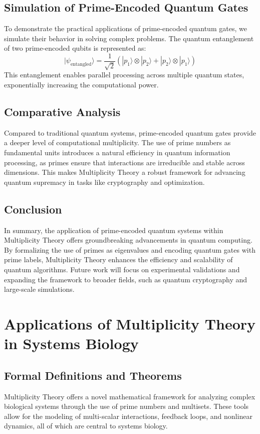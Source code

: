 \documentclass[%
 preprint, linenumbers,
 amsmath,amssymb,
 aps, physrev,
]{revtex4-2}
\begin{document}
\subsection{Simulation of Prime-Encoded Quantum Gates}
To demonstrate the practical applications of prime-encoded quantum gates, we simulate their behavior in solving complex problems. The quantum entanglement of two prime-encoded qubits is represented as:
\[
| \psi_{\text{entangled}} \rangle = \frac{1}{\sqrt{2}} \left( | p_1 \rangle \otimes | p_2 \rangle + | p_2 \rangle \otimes | p_1 \rangle \right)
\]
This entanglement enables parallel processing across multiple quantum states, exponentially increasing the computational power.

\subsection{Comparative Analysis}
Compared to traditional quantum systems, prime-encoded quantum gates provide a deeper level of computational multiplicity. The use of prime numbers as fundamental units introduces a natural efficiency in quantum information processing, as primes ensure that interactions are irreducible and stable across dimensions. This makes Multiplicity Theory a robust framework for advancing quantum supremacy in tasks like cryptography and optimization.

\subsection{Conclusion}
In summary, the application of prime-encoded quantum systems within Multiplicity Theory offers groundbreaking advancements in quantum computing. By formalizing the use of primes as eigenvalues and encoding quantum gates with prime labels, Multiplicity Theory enhances the efficiency and scalability of quantum algorithms. Future work will focus on experimental validations and expanding the framework to broader fields, such as quantum cryptography and large-scale simulations.

\section{Applications of Multiplicity Theory in Systems Biology}
\label{sec:SystemsBiology}

\subsection{Formal Definitions and Theorems}
Multiplicity Theory offers a novel mathematical framework for analyzing complex biological systems through the use of prime numbers and multisets. These tools allow for the modeling of multi-scalar interactions, feedback loops, and nonlinear dynamics, all of which are central to systems biology.
\end{document}
